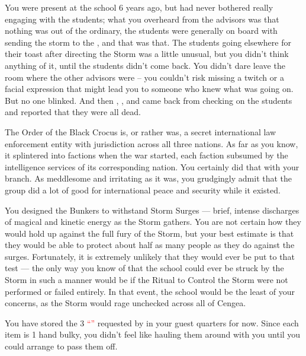 \documentclass[char]{GL2020}
\begin{document}
\begin{itemz}[Notes]
	\item You were present at the school 6 years ago, but had never bothered really engaging with the students; what you overheard from the advisors was that nothing was out of the ordinary, the students were generally on board with sending the storm to the \pTech{}, and that was that. The students going elsewhere for their toast after directing the Storm was a little unusual, but you didn't think anything of it, until the students didn't come back. You didn't dare leave the room where the other advisors were – you couldn't risk missing a twitch or a facial expression that might lead you to someone who knew what was going on. But no one blinked. And then \cPrincipal{}, \cDiplomat{\full}, and \cMusic{\full} came back from checking on the students and reported that they were all dead.
	\item The Order of the Black Crocus is, or rather was, a secret international law enforcement entity with jurisdiction across all three nations. As far as you know, it splintered into factions when the war started, each faction subsumed by the intelligence services of its corresponding nation. You certainly did that with your branch. As meddlesome and irritating as it was, you grudgingly admit that the group did a lot of good for international peace and security while it existed.
	\item You designed the Bunkers to withstand Storm Surges — brief, intense discharges of magical and kinetic energy as the Storm gathers. You are not certain how they would hold up against the full fury of the Storm, but your best estimate is that they would be able to protect about half as many people as they do against the surges. Fortunately, it is extremely unlikely that they would ever be put to that test — the only way you know of that the school could ever be struck by the Storm in such a manner would be if the Ritual to Control the Storm were not performed or failed entirely. In that event, the school would be the least of your concerns, as the Storm would rage unchecked across all of Cengea.
	\item You have stored the 3 \textcolor{red}{``\iMagitechParts{}''} requested by \cTechStar{} in your guest quarters for now. Since each item is 1 hand bulky, you didn't feel like hauling them around with you until you could arrange to pass them off.
\end{itemz}
\end{document}
